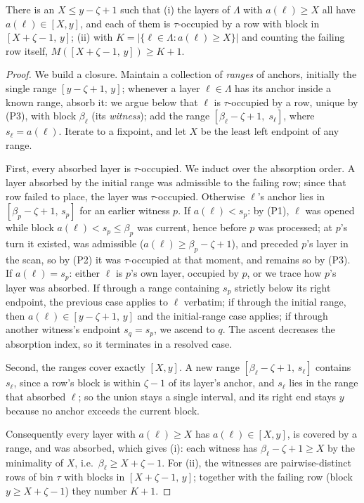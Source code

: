 \begin{lemma}\label{lem:blocking-Lprime}
There is an $X \le y-\zeta+1$ such that (i) the layers of $\Lambda$ with
$a(\ell)\ge X$ all have $a(\ell)\in[X,y]$, and each of them is
$\tau$-occupied by a row with block in $[X+\zeta-1,\,y]$; (ii) with
$K=|\{\ell\in\Lambda : a(\ell)\ge X\}|$ and counting the failing row
itself, $M([X+\zeta-1,\,y]) \ge K+1$.
\end{lemma}

\begin{proof}
We build a closure. Maintain a collection of \emph{ranges} of anchors,
initially the single range $[y-\zeta+1,\,y]$; whenever a layer
$\ell\in\Lambda$ has its anchor inside a known range, absorb it: we
argue below that $\ell$ is $\tau$-occupied by a row, unique by (P3),
with block $\beta_\ell$ (its \emph{witness}); add the range
$[\beta_\ell-\zeta+1,\;s_\ell]$, where $s_\ell = a(\ell)$. Iterate to a
fixpoint, and let $X$ be the least left endpoint of any range.

First, every absorbed layer is $\tau$-occupied. We induct over the
absorption order. A layer absorbed by the initial range was admissible
to the failing row; since that row failed to place, the layer was
$\tau$-occupied. Otherwise $\ell$'s anchor lies in
$[\beta_p-\zeta+1,\, s_p]$ for an earlier witness $p$. If
$a(\ell) < s_p$: by (P1), $\ell$ was opened while block
$a(\ell) < s_p \le \beta_p$ was current, hence before $p$ was
processed; at $p$'s turn it existed, was admissible
($a(\ell)\ge\beta_p-\zeta+1$), and preceded $p$'s layer in the scan, so
by (P2) it was $\tau$-occupied at that moment, and remains so by (P3). If
$a(\ell)=s_p$: either $\ell$ is $p$'s own layer, occupied by $p$, or we
trace how $p$'s layer was absorbed. If through a range containing $s_p$
strictly below its right endpoint, the previous case applies to $\ell$
verbatim; if through the initial range, then
$a(\ell)\in[y-\zeta+1,\,y]$ and the initial-range case applies; if through another
witness's endpoint $s_q=s_p$, we ascend to $q$. The ascent decreases
the absorption index, so it terminates in a resolved case.

Second, the ranges cover exactly $[X,y]$. A new range
$[\beta_\ell-\zeta+1,\, s_\ell]$ contains $s_\ell$, since a row's block
is within $\zeta-1$ of its layer's anchor, and $s_\ell$ lies in the
range that absorbed $\ell$; so the union stays a single interval, and
its right end stays $y$ because no anchor exceeds the current block.

Consequently every layer with $a(\ell)\ge X$ has $a(\ell)\in[X,y]$, is
covered by a range, and was absorbed, which gives (i): each witness has
$\beta_\ell-\zeta+1\ge X$ by the minimality of $X$, i.e.\
$\beta_\ell\ge X+\zeta-1$. For (ii), the witnesses are pairwise-distinct
rows of bin $\tau$ with blocks in $[X+\zeta-1,\,y]$; together with the
failing row (block $y \ge X+\zeta-1$) they number $K+1$.
\end{proof}

